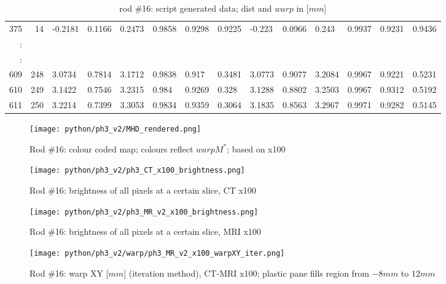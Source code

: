 \begin{table}[p]
{\begin{minipage}{\textheight}
\begin{tabular}{rr||lll|lll||lll|lll}
375    & 14   & -0.2181 & 0.1166  & 0.2473 & 0.9858 & 0.9298 & 0.9225 & -0.223  & 0.0966  & 0.243  & 0.9937 & 0.9231 & 0.9436 \\
:      &      &         &         &        &        &        &        &         &         &        &        &        &        \\
\hline
:      &      &         &         &        &        &        &        &         &         &        &        &        &        \\
609    & 248  & 3.0734  & 0.7814  & 3.1712 & 0.9838 & 0.917  & 0.3481 & 3.0773  & 0.9077  & 3.2084 & 0.9967 & 0.9221 & 0.5231 \\
610    & 249  & 3.1422  & 0.7546  & 3.2315 & 0.984  & 0.9269 & 0.328  & 3.1288  & 0.8802  & 3.2503 & 0.9967 & 0.9312 & 0.5192 \\
611    & 250  & 3.2214  & 0.7399  & 3.3053 & 0.9834 & 0.9359 & 0.3064 & 3.1835  & 0.8563  & 3.2967 & 0.9971 & 0.9282 & 0.5145
\end{tabular}
       \caption{rod \#16: script generated data; dist and $warp$ in [$mm$]}
       \label{tab:spit-out-16}
     \end{minipage}
   }
 \end{table}

\begin{figure}[!htb]
     \centering
     \texttt{[image: python/ph3\_v2/MHD\_rendered.png]}
     \caption{Rod \#16: colour coded map; colours reflect $warpM^*$; based on x100}
     \label{fig:colour-map}
\end{figure}

\begin{figure}[!thb]
    \centering
    \texttt{[image: python/ph3\_v2/ph3\_CT\_x100\_brightness.png]}
    \caption{Rod \#16: brightness of all pixels at a certain slice, CT x100}
    \label{fig:ph3_CT_x100_brightness}
\end{figure}

\begin{figure}[!tbh]
    \centering
    \texttt{[image: python/ph3\_v2/ph3\_MR\_v2\_x100\_brightness.png]}
    \caption{Rod \#16: brightness of all pixels at a certain slice, MRI x100}
    \label{fig:ph3_MR_x100_brightness}
\end{figure}


\begin{figure}[!hbt]
  \centering
  \texttt{[image: python/ph3\_v2/warp/ph3\_MR\_v2\_x100\_warpXY\_iter.png]}
  \caption{Rod \#16: warp XY [$mm$] (iteration method), CT-MRI x100; plastic pane fills region from $-8mm$ to $12mm$}
  \label{fig:ph3_warpXY_x100}
\end{figure}

